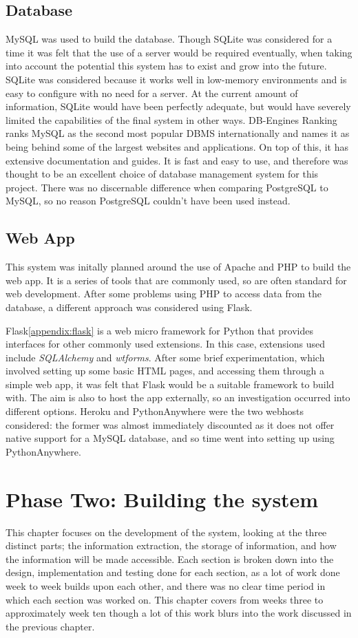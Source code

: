 \documentclass[11pt,a4paper]{book}
\begin{document}
\section{Database}
MySQL was used to build the database. Though SQLite was considered for a time it was felt that the use of a server would be required eventually, when taking into account the potential this system has to exist and grow into the future. SQLite was considered because it works well in low-memory environments and is easy to configure with no need for a server. At the current amount of information, SQLite would have been perfectly adequate, but would have severely limited the capabilities of the final system in other ways. DB-Engines Ranking\cite{db-ranking} ranks MySQL as the second most popular DBMS internationally and names it as being behind some of the largest websites and applications. On top of this,  it has extensive documentation and guides. It is fast and easy to use, and therefore was thought to be an excellent choice of database management system for this project. There was no discernable difference when comparing PostgreSQL to MySQL, so no reason PostgreSQL couldn't have been used instead. 

\section{Web App}

This system was initally planned around the use of Apache and PHP to build the web app. It is a series of tools that are commonly used, so are often standard for web development. After some problems using PHP to access data from the database, a different approach was considered using Flask.

Flask\ref{appendix:flask} is a web micro framework for Python that provides interfaces for other commonly used extensions. In this case, extensions used include \textit{SQLAlchemy} and \textit{wtforms}. After some brief experimentation, which involved setting up some basic HTML pages, and accessing them through a simple web app, it was felt that Flask would be a suitable framework to build with. The aim is also to host the app externally, so an investigation occurred into different options. Heroku and PythonAnywhere were the two webhosts considered: the former was almost immediately discounted as it does not offer native support for a MySQL database, and so time went into setting up using PythonAnywhere.

\chapter{Phase Two: Building the system}
This chapter focuses on the development of the system, looking at the three distinct parts; the information extraction, the storage of information, and how the information will be made accessible. Each section is broken down into the design, implementation and testing done for each section, as a lot of work done week to week builds upon each other, and there was no clear time period in which each section was worked on. This chapter covers from weeks three to approximately week ten though a lot of this work blurs into the work discussed in the previous chapter.
\end{document}
